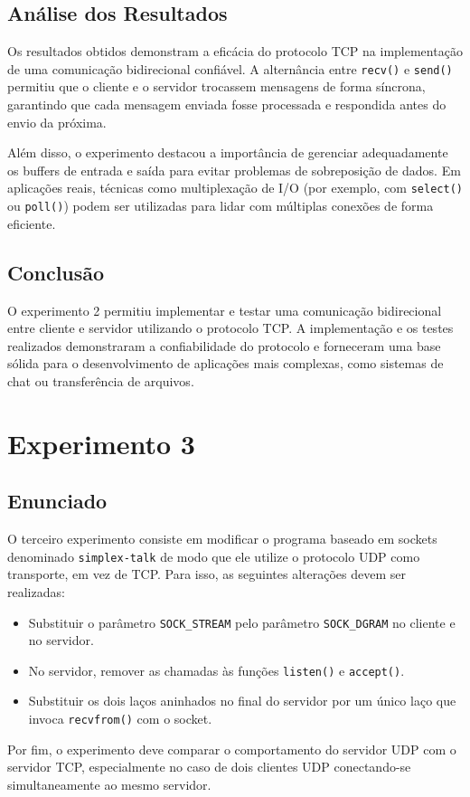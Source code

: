 \subsection*{Análise dos Resultados}

Os resultados obtidos demonstram a eficácia do protocolo TCP na implementação de uma comunicação bidirecional confiável. A alternância entre \texttt{recv()} e \texttt{send()} permitiu que o cliente e o servidor trocassem mensagens de forma síncrona, garantindo que cada mensagem enviada fosse processada e respondida antes do envio da próxima.

Além disso, o experimento destacou a importância de gerenciar adequadamente os buffers de entrada e saída para evitar problemas de sobreposição de dados. Em aplicações reais, técnicas como multiplexação de I/O (por exemplo, com \texttt{select()} ou \texttt{poll()}) podem ser utilizadas para lidar com múltiplas conexões de forma eficiente.

\subsection*{Conclusão}

O experimento 2 permitiu implementar e testar uma comunicação bidirecional entre cliente e servidor utilizando o protocolo TCP. A implementação e os testes realizados demonstraram a confiabilidade do protocolo e forneceram uma base sólida para o desenvolvimento de aplicações mais complexas, como sistemas de chat ou transferência de arquivos.

\section*{Experimento 3}

\subsection*{Enunciado}

O terceiro experimento consiste em modificar o programa baseado em sockets denominado \texttt{simplex-talk} de modo que ele utilize o protocolo UDP como transporte, em vez de TCP. Para isso, as seguintes alterações devem ser realizadas:
\begin{itemize}
    \item Substituir o parâmetro \texttt{SOCK\_STREAM} pelo parâmetro \texttt{SOCK\_DGRAM} no cliente e no servidor.
    \item No servidor, remover as chamadas às funções \texttt{listen()} e \texttt{accept()}.
    \item Substituir os dois laços aninhados no final do servidor por um único laço que invoca \texttt{recvfrom()} com o socket.
\end{itemize}
Por fim, o experimento deve comparar o comportamento do servidor UDP com o servidor TCP, especialmente no caso de dois clientes UDP conectando-se simultaneamente ao mesmo servidor.

